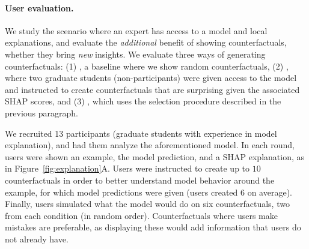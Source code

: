 \paragraph{User evaluation.} We study the scenario where an expert has access to a model and local explanations, and evaluate the \emph{additional} benefit of showing counterfactuals, \ie whether they bring \emph{new} insights. 
We evaluate three ways of generating counterfactuals: (1) \crandom, a baseline where we show random \sysname{} counterfactuals, (2) \chuman, where two graduate students (non-participants) were given access to the model and instructed to create counterfactuals that are surprising given the associated SHAP scores, and (3) \cshap, which uses the selection procedure described in the previous paragraph.

We recruited 13 participants (graduate students with experience in model explanation), and had them analyze the aforementioned \qqp model. In each round, users were shown an example, the model prediction, and a SHAP explanation, as in Figure~\ref{fig:explanation}A. Users were instructed to create up to $10$ counterfactuals in order to better understand model behavior around the example, for which model predictions were given (users created $6$ on average). 
Finally, users simulated what the model would do on six counterfactuals, two from each condition (in random order). Counterfactuals where users make mistakes are preferable, as displaying these would add information that users do not already have.


